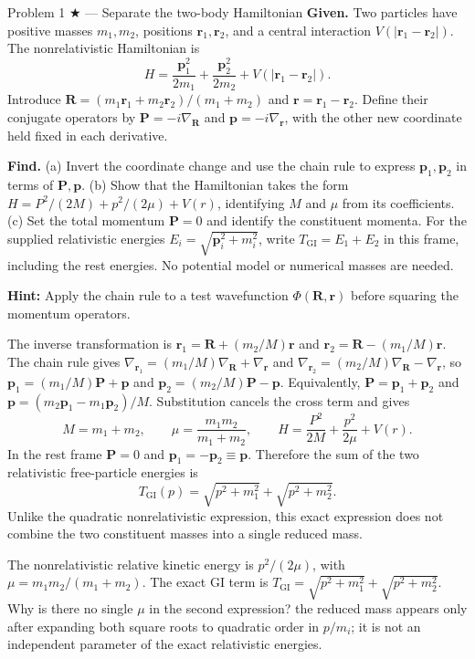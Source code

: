 \documentclass[11pt]{article}
\begin{document}
\begin{problem}{Problem 1 ★ — Separate the two-body Hamiltonian}
\textbf{Given.} Two particles have positive masses $m_1,m_2$, positions
$\bm r_1,\bm r_2$, and a central interaction $V(|\bm r_1-\bm r_2|)$.
The nonrelativistic Hamiltonian is
\[
H=\frac{\bm p_1^2}{2m_1}+\frac{\bm p_2^2}{2m_2}
 +V(|\bm r_1-\bm r_2|).
\]
Introduce $\bm R=(m_1\bm r_1+m_2\bm r_2)/(m_1+m_2)$ and
$\bm r=\bm r_1-\bm r_2$. Define their conjugate operators by
$\bm P=-i\nabla_{\bm R}$ and $\bm p=-i\nabla_{\bm r}$, with the other new
coordinate held fixed in each derivative.

\textbf{Find.} (a) Invert the coordinate change and use the chain rule to
express $\bm p_1,\bm p_2$ in terms of $\bm P,\bm p$.
(b) Show that the Hamiltonian takes the form
$H=P^2/(2M)+p^2/(2\mu)+V(r)$, identifying $M$ and $\mu$ from its coefficients.
(c) Set the total momentum $\bm P=0$ and identify the constituent momenta.
For the supplied relativistic energies $E_i=\sqrt{\bm p_i^2+m_i^2}$,
write $T_{\mathrm{GI}}=E_1+E_2$ in this frame, including the rest energies.
No potential model or numerical masses are needed.

\textbf{Hint:} Apply the chain rule to a test wavefunction
$\Phi(\bm R,\bm r)$ before squaring the momentum operators.
\end{problem}
\begin{solution}
The inverse transformation is $\bm r_1=\bm R+(m_2/M)\bm r$ and
$\bm r_2=\bm R-(m_1/M)\bm r$. The chain rule gives
$\nabla_{\bm r_1}=(m_1/M)\nabla_{\bm R}+\nabla_{\bm r}$ and
$\nabla_{\bm r_2}=(m_2/M)\nabla_{\bm R}-\nabla_{\bm r}$, so
$\bm p_1=(m_1/M)\bm P+\bm p$ and
$\bm p_2=(m_2/M)\bm P-\bm p$. Equivalently,
$\bm P=\bm p_1+\bm p_2$ and
$\bm p=(m_2\bm p_1-m_1\bm p_2)/M$. Substitution cancels the cross term and gives
\[
M=m_1+m_2,\qquad \mu=\frac{m_1m_2}{m_1+m_2},\qquad
H=\frac{P^2}{2M}+\frac{p^2}{2\mu}+V(r).
\]
In the rest frame $\bm P=0$ and $\bm p_1=-\bm p_2\equiv\bm p$. Therefore the
sum of the two relativistic free-particle energies is
\[
T_{\mathrm{GI}}(p)=\sqrt{p^2+m_1^2}+\sqrt{p^2+m_2^2}.
\]
Unlike the quadratic nonrelativistic expression, this exact expression does not
combine the two constituent masses into a single reduced mass.
\end{solution}
\begin{quiz}
The nonrelativistic relative kinetic energy is $p^2/(2\mu)$, with
$\mu=m_1m_2/(m_1+m_2)$. The exact GI term is
$T_{\mathrm{GI}}=\sqrt{p^2+m_1^2}+\sqrt{p^2+m_2^2}$. Why is there no single
$\mu$ in the second expression? \answer the reduced mass appears only after
expanding both square roots to quadratic order in $p/m_i$; it is not an
independent parameter of the exact relativistic energies.
\end{quiz}
\end{document}
